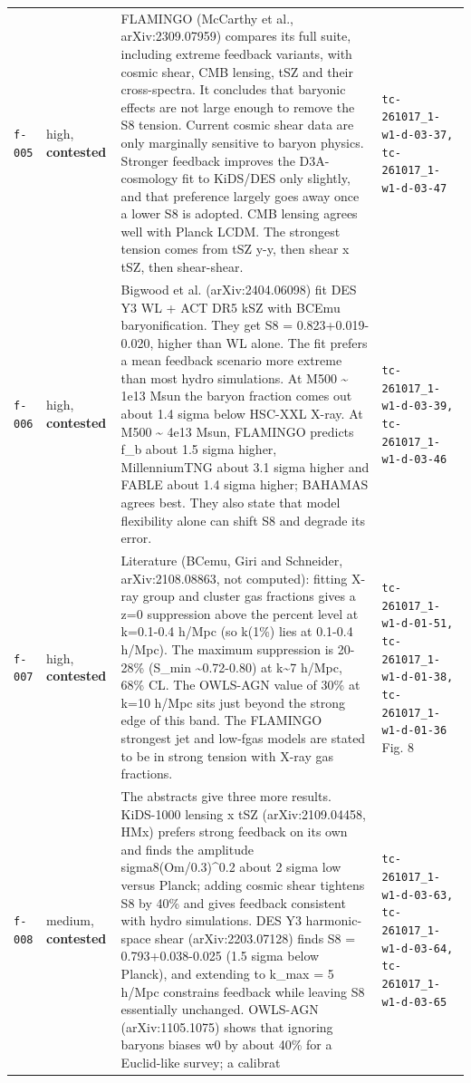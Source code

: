 \documentclass[11pt,a4paper]{article}
\begin{document}
\begin{longtable}{@{}p{}p{}p{}p{}@{}}
\texttt{f-005} & high, \textbf{contested} & FLAMINGO (McCarthy et al., arXiv:2309.07959) compares its full suite, including extreme feedback variants, with cosmic shear, CMB lensing, tSZ and their cross-spectra. It concludes that baryonic effects are not large enough to remove the S8 tension. Current cosmic shear data are only marginally sensitive to baryon physics. Stronger feedback improves the D3A-cosmology fit to KiDS/DES only slightly, and that preference largely goes away once a lower S8 is adopted. CMB lensing agrees well with Planck LCDM. The strongest tension comes from tSZ y-y, then shear x tSZ, then shear-shear. & \texttt{tc-261017\_\allowbreak{}1-w1-d-03-37,\allowbreak{} tc-261017\_\allowbreak{}1-w1-d-03-47} \\
\texttt{f-006} & high, \textbf{contested} & Bigwood et al. (arXiv:2404.06098) fit DES Y3 WL + ACT DR5 kSZ with BCEmu baryonification. They get S8 = 0.823+0.019-0.020, higher than WL alone. The fit prefers a mean feedback scenario more extreme than most hydro simulations. At M500 \textasciitilde{} 1e13 Msun the baryon fraction comes out about 1.4 sigma below HSC-XXL X-ray. At M500 \textasciitilde{} 4e13 Msun, FLAMINGO predicts f\_b about 1.5 sigma higher, MillenniumTNG about 3.1 sigma higher and FABLE about 1.4 sigma higher; BAHAMAS agrees best. They also state that model flexibility alone can shift S8 and degrade its error. & \texttt{tc-261017\_\allowbreak{}1-w1-d-03-39,\allowbreak{} tc-261017\_\allowbreak{}1-w1-d-03-46} \\
\texttt{f-007} & high, \textbf{contested} & Literature (BCemu, Giri and Schneider, arXiv:2108.08863, not computed): fitting X-ray group and cluster gas fractions gives a z=0 suppression above the percent level at k=0.1-0.4 h/Mpc (so k(1\%) lies at 0.1-0.4 h/Mpc). The maximum suppression is 20-28\% (S\_min \textasciitilde{}0.72-0.80) at k\textasciitilde{}7 h/Mpc, 68\% CL. The OWLS-AGN value of 30\% at k=10 h/Mpc sits just beyond the strong edge of this band. The FLAMINGO strongest jet and low-fgas models are stated to be in strong tension with X-ray gas fractions. & \texttt{tc-261017\_\allowbreak{}1-w1-d-01-51,\allowbreak{} tc-261017\_\allowbreak{}1-w1-d-01-38,\allowbreak{} tc-261017\_\allowbreak{}1-w1-d-01-36} Fig. 8 \\
\texttt{f-008} & medium, \textbf{contested} & The abstracts give three more results. KiDS-1000 lensing x tSZ (arXiv:2109.04458, HMx) prefers strong feedback on its own and finds the amplitude sigma8(Om/0.3)\textasciicircum{}0.2 about 2 sigma low versus Planck; adding cosmic shear tightens S8 by 40\% and gives feedback consistent with hydro simulations. DES Y3 harmonic-space shear (arXiv:2203.07128) finds S8 = 0.793+0.038-0.025 (1.5 sigma below Planck), and extending to k\_max = 5 h/Mpc constrains feedback while leaving S8 essentially unchanged. OWLS-AGN (arXiv:1105.1075) shows that ignoring baryons biases w0 by about 40\% for a Euclid-like survey; a calibrat & \texttt{tc-261017\_\allowbreak{}1-w1-d-03-63,\allowbreak{} tc-261017\_\allowbreak{}1-w1-d-03-64,\allowbreak{} tc-261017\_\allowbreak{}1-w1-d-03-65} \\

\end{longtable}
\end{document}
